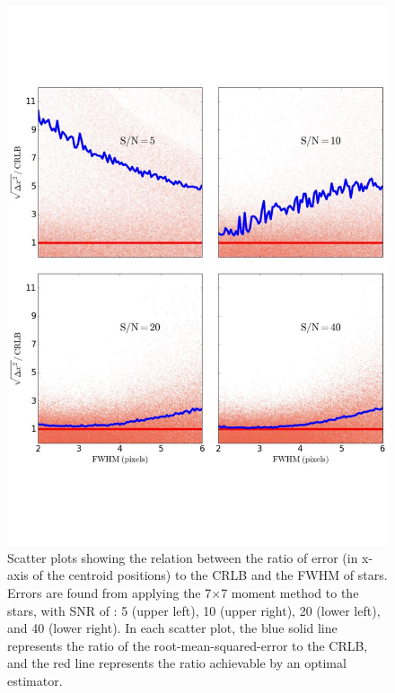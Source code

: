 \documentclass[onecolumn]{aastex61}
\newcommand{\todo}[1]{{\textcolor{dred}{ #1}}}
\begin{document}
\begin{figure}[p]~\\
\begin{center}
\includegraphics[width=0.65\linewidth]{new_fwhm_moment.pdf}
\caption{\todo{Scatter plots showing the relation between the ratio of error (in x-axis of the centroid positions) to the CRLB and the FWHM of stars.
Errors are found from applying the 7$\times$7 moment method to the stars, with SNR  of : 5 (upper left), 10 (upper right), 20 (lower left), and 40 (lower right). In each scatter plot, the blue solid line represents the ratio of the root-mean-squared-error to the CRLB, and the red line represents the ratio achievable by an optimal estimator.}}\label{8}
\end{center}
\end{figure}
\end{document}
